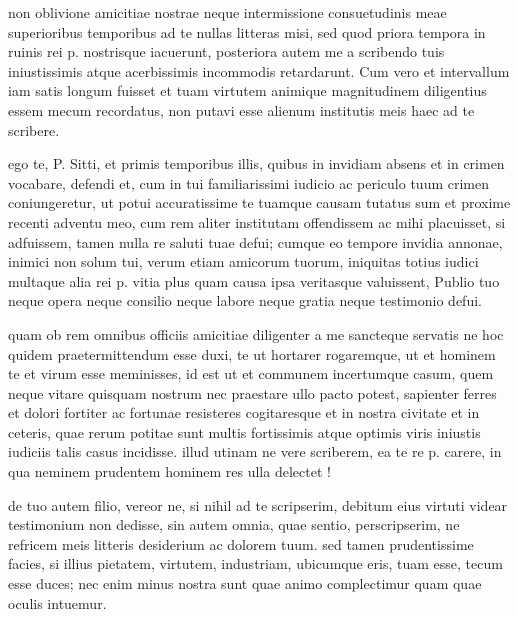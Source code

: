 


 non oblivione amicitiae nostrae neque intermissione consuetudinis meae superioribus temporibus ad te nullas litteras misi, sed quod priora tempora in ruinis rei p. nostrisque iacuerunt, posteriora autem me a scribendo tuis iniustissimis atque acerbissimis incommodis retardarunt. Cum vero et intervallum iam satis longum fuisset et tuam virtutem animique magnitudinem diligentius essem mecum recordatus, non putavi esse alienum institutis meis haec ad te scribere.

 ego te, P. Sitti, et primis temporibus illis, quibus in invidiam absens et in crimen vocabare, defendi et, cum in tui familiarissimi iudicio ac periculo tuum crimen coniungeretur, ut potui accuratissime te tuamque causam tutatus sum et proxime recenti adventu meo, cum rem aliter institutam offendissem ac mihi placuisset, si adfuissem, tamen nulla re saluti tuae defui; cumque eo tempore invidia annonae, inimici non solum tui, verum etiam amicorum tuorum, iniquitas totius iudici multaque alia rei p. vitia plus quam causa ipsa veritasque valuissent, Publio tuo neque opera neque consilio neque labore neque gratia neque testimonio defui.

 quam ob rem omnibus officiis amicitiae diligenter a me sancteque servatis ne hoc quidem praetermittendum esse duxi, te ut hortarer rogaremque, ut et hominem te et virum esse meminisses, id est ut et communem incertumque casum, quem neque vitare quisquam nostrum nec praestare ullo pacto potest, sapienter ferres et dolori fortiter ac fortunae resisteres cogitaresque et in nostra civitate et in ceteris, quae rerum potitae sunt multis fortissimis atque optimis viris iniustis iudiciis talis casus incidisse. illud utinam ne vere scriberem, ea te re p. carere, in qua neminem prudentem hominem res ulla delectet !

 de tuo autem filio, vereor ne, si nihil ad te scripserim, debitum eius virtuti videar testimonium non dedisse, sin autem omnia, quae sentio, perscripserim, ne refricem meis litteris desiderium ac dolorem tuum. sed tamen prudentissime facies, si illius pietatem, virtutem, industriam, ubicumque eris, tuam esse, tecum esse duces; nec enim minus nostra sunt quae animo complectimur quam quae oculis intuemur.

